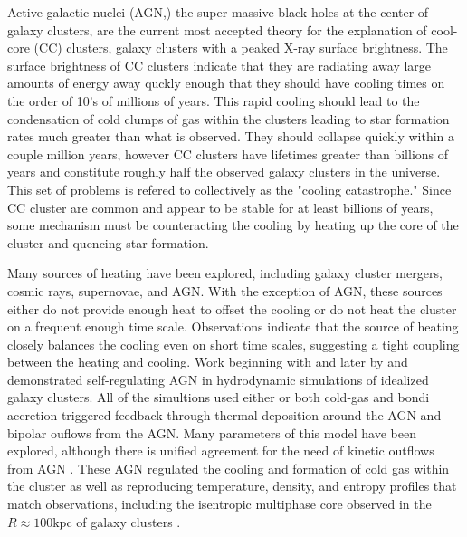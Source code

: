 \documentclass[iop,apjl, twocolappendix]{emulateapj}   %
\begin{document}

Active galactic nuclei (AGN,) the super massive black holes at the center of
galaxy clusters, are the current most accepted theory for the explanation of
cool-core (CC) clusters, galaxy clusters with a peaked X-ray surface
brightness.  The surface brightness of CC clusters indicate that they are
radiating away large amounts of energy away quckly enough that they should have
cooling times on the order of 10's of millions of years. This rapid cooling
should lead to the condensation of cold clumps of gas within the clusters
leading to star formation rates much greater than what is observed. They should
collapse quickly within a couple million years, however CC clusters have
lifetimes greater than billions of years and constitute roughly half the
observed galaxy clusters in the universe. This set of problems is refered to
collectively as the "cooling catastrophe." Since CC cluster are common and
appear to be stable for at least billions of years, some mechanism must be
counteracting the cooling by heating up the core of the cluster and quencing
star formation.

Many sources of heating have been explored, including galaxy cluster mergers,
cosmic rays, supernovae, and AGN. With the exception of AGN, these sources
either do not provide enough heat to offset the cooling or do not heat the
cluster on a frequent enough time scale. Observations indicate that the source
of heating closely balances the cooling even on short time scales, suggesting a
tight coupling between the heating and cooling. Work beginning with
\citep{gaspari_dance_2011} and later by \citep{li_cooling_2015} and
\citep{meece_triggering_2017} demonstrated self-regulating AGN in hydrodynamic
simulations of idealized galaxy clusters. All of the simultions used either or
both cold-gas and bondi accretion triggered feedback through thermal deposition
around the AGN and bipolar ouflows from the AGN. Many parameters of this model
have been explored, although there is unified agreement for the need of kinetic
outflows from AGN \cite{meece_jr_agn_2016,meece_triggering_2017}. These AGN
regulated the cooling and formation of cold gas within the cluster as well as
reproducing temperature, density, and entropy profiles that match observations,
including the isentropic multiphase core observed in the $R\approx 100 \text{
  kpc}$ of galaxy clusters \cite{gaspari_cause_2012}.
\end{document}
